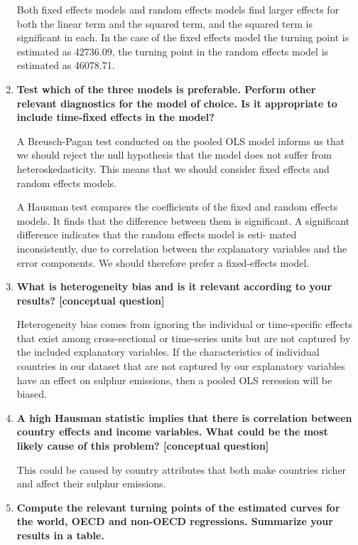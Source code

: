 \documentclass{scrartcl}
\begin{document}
\begin{enumerate}
	Both fixed effects models and random effects models find larger effects for both the linear term and the squared term, and the squared term is significant in each. In the case of the fixed effects model the turning point is estimated as 42736.09, the turning point in the random effects model is estimated as 46078.71.
	
	\item \textbf{Test which of the three models is preferable. Perform other relevant diagnostics for the model of choice. Is it appropriate to include time-fixed effects in the model?}
	
	
	
	A Breusch-Pagan test conducted on the pooled OLS model informs us that we should reject the null hypothesis that the model does not suffer from heteroskedasticity. This means that we should consider fixed effects and random effects models.
	
	A Hausman test compares the coefficients of the fixed and random effects models. It finds that the difference between them is significant. A significant difference indicates that the random effects model is esti-
mated inconsistently, due to correlation between the explanatory variables and the
error components.	We should therefore prefer a fixed-effects model.
	
	\item \textbf{What is heterogeneity bias and is it relevant according to your results? [conceptual question]}
	
	Heterogeneity bias comes from ignoring the individual or time-specific effects that exist among cross-sectional or time-series units but are not captured by the included explanatory variables. If the characteristics of individual countries in our dataset that are not captured by our explanatory variables have an effect on sulphur emissions, then a pooled OLS reression will be biased.
	
	\item \textbf{A high Hausman statistic implies that there is correlation between country effects and income variables. What could be the most likely cause of this problem? [conceptual question]}
	
	This could be caused by country attributes that both make countries richer and affect their sulphur emissions.
		
	\item \textbf{Compute the relevant turning points of the estimated curves for the world, OECD and non-OECD regressions. Summarize your results in a table.}
	

\end{enumerate}
\end{document}
